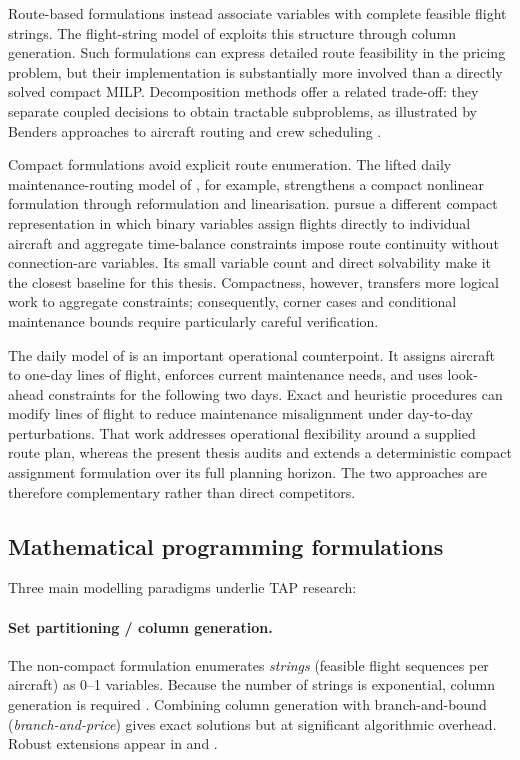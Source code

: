 Route-based formulations instead associate variables with complete feasible
flight strings. The flight-string model of \citet{barnhart1998flight} exploits
this structure through column generation. Such formulations can express
detailed route feasibility in the pricing problem, but their implementation is
substantially more involved than a directly solved compact MILP. Decomposition
methods offer a related trade-off: they separate coupled decisions to obtain
tractable subproblems, as illustrated by Benders approaches to aircraft routing
and crew scheduling \citep{cordeau2001benders, mercier2005computational}.

Compact formulations avoid explicit route enumeration. The lifted daily
maintenance-routing model of \citet{haouari2012lifted}, for example, strengthens
a compact nonlinear formulation through reformulation and linearisation.
\citet{khaled2018compact} pursue a different compact representation in which
binary variables assign flights directly to individual aircraft and aggregate
time-balance constraints impose route continuity without connection-arc
variables. Its small variable count and direct solvability make it the closest
baseline for this thesis. Compactness, however, transfers more logical work to
aggregate constraints; consequently, corner cases and conditional maintenance
bounds require particularly careful verification.

The daily model of \citet{maher2018daily} is an important operational
counterpoint. It assigns aircraft to one-day lines of flight, enforces current
maintenance needs, and uses look-ahead constraints for the following two days.
Exact and heuristic procedures can modify lines of flight to reduce maintenance
misalignment under day-to-day perturbations. That work addresses operational
flexibility around a supplied route plan, whereas the present thesis audits and
extends a deterministic compact assignment formulation over its full planning
horizon. The two approaches are therefore complementary rather than direct
competitors.



\subsection{Mathematical programming formulations}

Three main modelling paradigms underlie TAP research:

\paragraph{Set partitioning / column generation.}
The non-compact formulation enumerates \emph{strings} (feasible flight
sequences per aircraft) as 0--1 variables.  Because the number of strings is
exponential, column generation is required
\citep{lavoie1988new, minoux1984column, barnhart1998flight, sarac2006branch}.
Combining column generation with branch-and-bound (\emph{branch-and-price})
gives exact solutions but at significant algorithmic overhead.  Robust
extensions appear in \citet{borndorfer2010robust} and
\citet{froyland2013recoverable}.

